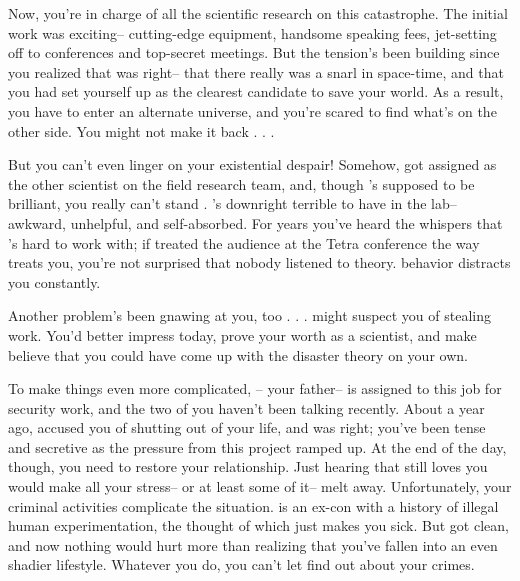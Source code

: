 \documentclass[char]{guildcamp3}
\begin{document}
Now, you're in charge of all the scientific research on this catastrophe. The initial work was exciting-- cutting-edge equipment, handsome speaking fees, jet-setting off to conferences and top-secret meetings. But the tension's been building since you realized that \cSciTwo{} was right-- that there really was a snarl in space-time, and that you had set yourself up as the clearest candidate to save your world. As a result, you have to enter an alternate universe, and you're scared to find what's on the other side. You might not make it back . . .

But you can't even linger on your existential despair! Somehow, \cSciTwo{} got assigned as the other scientist on the field research team, and, though \cSciTwo{\they}'s supposed to be brilliant, you really can't stand \cSciTwo{\them}. \cSciTwo{\they}'s downright terrible to have in the lab-- awkward, unhelpful, and self-absorbed. For years you've heard the whispers that \cSciTwo{\they}'s hard to work with; if \cSciTwo{\they} treated the audience at the Tetra conference the way \cSciTwo{\they} treats you, you're not surprised that nobody listened to \cSciTwo{\their} theory. \cSciTwo{\Their} behavior distracts you constantly.

Another problem's been gnawing at you, too . . . \cSciTwo{\they} might suspect you of stealing \cSciTwo{\their} work. You'd better impress \cSciTwo{\them} today, prove your worth as a scientist, and make \cSciTwo{\them} believe that you could have come up with the disaster theory on your own.

To make things even more complicated, \cSpecOpOne{\intro}-- your father-- is assigned to this job for security work, and the two of you haven't been talking recently. About a year ago, \cSpecOpOne{\they} accused you of shutting \cSpecOpOne{\them} out of your life, and \cSpecOpOne{\they} was right; you've been tense and secretive as the pressure from this project ramped up. At the end of the day, though, you need to restore your relationship. Just hearing that \cSpecOpOne{\they} still loves you would make all your stress-- or at least some of it-- melt away. Unfortunately, your criminal activities complicate the situation. \cSpecOpOne{} is an ex-con with a history of illegal human experimentation, the thought of which just makes you sick. But \cSpecOpOne{\they} got clean, and now nothing would hurt \cSpecOpOne{\them} more than realizing that you've fallen into an even shadier lifestyle. Whatever you do, you can't let \cSpecOpOne{\them} find out about your crimes.
\end{document}
